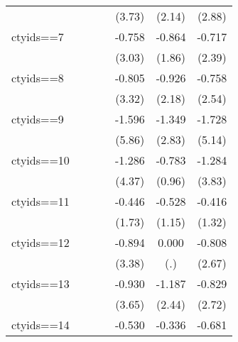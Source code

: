 \begin{table}[htbp]
\begin{center}
\begin{threeparttable}
\begin{tabular}{l*{6}{c}}
                &                  &                  &                  &   (3.73)         &   (2.14)         &   (2.88)         \\
ctyids==7       &                  &                  &                  &   -0.758\sym{***}&   -0.864\sym{*}  &   -0.717\sym{**} \\
                &                  &                  &                  &   (3.03)         &   (1.86)         &   (2.39)         \\
ctyids==8       &                  &                  &                  &   -0.805\sym{***}&   -0.926\sym{**} &   -0.758\sym{**} \\
                &                  &                  &                  &   (3.32)         &   (2.18)         &   (2.54)         \\
ctyids==9       &                  &                  &                  &   -1.596\sym{***}&   -1.349\sym{***}&   -1.728\sym{***}\\
                &                  &                  &                  &   (5.86)         &   (2.83)         &   (5.14)         \\
ctyids==10      &                  &                  &                  &   -1.286\sym{***}&   -0.783         &   -1.284\sym{***}\\
                &                  &                  &                  &   (4.37)         &   (0.96)         &   (3.83)         \\
ctyids==11      &                  &                  &                  &   -0.446\sym{*}  &   -0.528         &   -0.416         \\
                &                  &                  &                  &   (1.73)         &   (1.15)         &   (1.32)         \\
ctyids==12      &                  &                  &                  &   -0.894\sym{***}&    0.000         &   -0.808\sym{***}\\
                &                  &                  &                  &   (3.38)         &      (.)         &   (2.67)         \\
ctyids==13      &                  &                  &                  &   -0.930\sym{***}&   -1.187\sym{**} &   -0.829\sym{***}\\
                &                  &                  &                  &   (3.65)         &   (2.44)         &   (2.72)         \\
ctyids==14      &                  &                  &                  &   -0.530\sym{**} &   -0.336         &   -0.681\sym{**} \\

\end{tabular}
\end{threeparttable}
\end{center}
\end{table}
